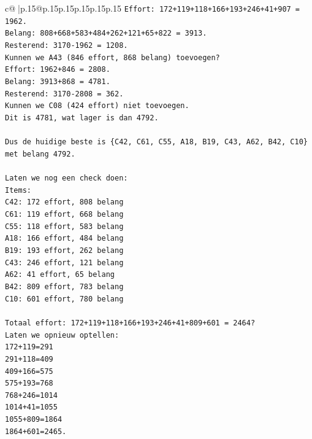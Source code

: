 \documentclass{article}
\begin{document}
{\begin{supertabular}{c@{$\;$}|p{.15\linewidth}@{}p{.15\linewidth}p{.15\linewidth}p{.15\linewidth}p{.15\linewidth}p{.15\linewidth}}
{{{\texttt{Effort: 172+119+118+166+193+246+41+907 = 1962.} \\
\texttt{Belang: 808+668+583+484+262+121+65+822 = 3913.} \\
\texttt{Resterend: 3170{-}1962 = 1208.} \\
\texttt{Kunnen we A43 (846 effort, 868 belang) toevoegen?} \\
\texttt{Effort: 1962+846 = 2808.} \\
\texttt{Belang: 3913+868 = 4781.} \\
\texttt{Resterend: 3170{-}2808 = 362.} \\
\texttt{Kunnen we C08 (424 effort) niet toevoegen.} \\
\texttt{Dit is 4781, wat lager is dan 4792.} \\
\\ 
\texttt{Dus de huidige beste is \{C42, C61, C55, A18, B19, C43, A62, B42, C10\} met belang 4792.} \\
\\ 
\texttt{Laten we nog een check doen:} \\
\texttt{Items:} \\
\texttt{C42: 172 effort, 808 belang} \\
\texttt{C61: 119 effort, 668 belang} \\
\texttt{C55: 118 effort, 583 belang} \\
\texttt{A18: 166 effort, 484 belang} \\
\texttt{B19: 193 effort, 262 belang} \\
\texttt{C43: 246 effort, 121 belang} \\
\texttt{A62: 41 effort, 65 belang} \\
\texttt{B42: 809 effort, 783 belang} \\
\texttt{C10: 601 effort, 780 belang} \\
\\ 
\texttt{Totaal effort: 172+119+118+166+193+246+41+809+601 = 2464?} \\
\texttt{Laten we opnieuw optellen:} \\
\texttt{172+119=291} \\
\texttt{291+118=409} \\
\texttt{409+166=575} \\
\texttt{575+193=768} \\
\texttt{768+246=1014} \\
\texttt{1014+41=1055} \\
\texttt{1055+809=1864} \\
\texttt{1864+601=2465.} \\
}}}
\end{supertabular}}
\end{document}
